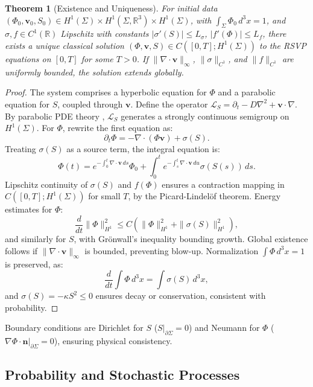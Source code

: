 \documentclass[12pt]{article}
\newtheorem{theorem}{Theorem}
\begin{document}
\begin{theorem}[Existence and Uniqueness]
\label{thm:well-posedness}
For initial data \((\Phi_0, \mathbf{v}_0, S_0) \in H^1(\Sigma) \times H^1(\Sigma, \mathbb{R}^3) \times H^1(\Sigma)\), with \(\int_\Sigma \Phi_0 \, d^3x = 1\), and \(\sigma, f \in C^1(\mathbb{R})\) Lipschitz with constants \(|\sigma'(S)| \leq L_\sigma\), \(|f'(\Phi)| \leq L_f\), there exists a unique classical solution \((\Phi, \mathbf{v}, S) \in C([0, T]; H^1(\Sigma))\) to the RSVP equations on \([0, T]\) for some \(T > 0\). If \(\|\nabla \cdot \mathbf{v}\|_\infty\), \(\|\sigma\|_{C^1}\), and \(\|f\|_{C^1}\) are uniformly bounded, the solution extends globally.
\end{theorem}

\begin{proof}
The system comprises a hyperbolic equation for \(\Phi\) and a parabolic equation for \(S\), coupled through \(\mathbf{v}\). Define the operator \(\mathcal{L}_S = \partial_t - D \nabla^2 + \mathbf{v} \cdot \nabla\). By parabolic PDE theory \citep{Risken1996}, \(\mathcal{L}_S\) generates a strongly continuous semigroup on \(H^1(\Sigma)\). For \(\Phi\), rewrite the first equation as:
\[
\partial_t \Phi = -\nabla \cdot (\Phi \mathbf{v}) + \sigma(S).
\]
Treating \(\sigma(S)\) as a source term, the integral equation is:
\[
\Phi(t) = e^{-\int_0^t \nabla \cdot \mathbf{v} \, ds} \Phi_0 + \int_0^t e^{-\int_s^t \nabla \cdot \mathbf{v} \, du} \sigma(S(s)) \, ds.
\]
Lipschitz continuity of \(\sigma(S)\) and \(f(\Phi)\) ensures a contraction mapping in \(C([0, T]; H^1(\Sigma))\) for small \(T\), by the Picard-Lindelöf theorem. Energy estimates for \(\Phi\):
\[
\frac{d}{dt} \|\Phi\|_{H^1}^2 \leq C (\|\Phi\|_{H^1}^2 + \|\sigma(S)\|_{H^1}^2),
\]
and similarly for \(S\), with Grönwall’s inequality bounding growth. Global existence follows if \(\|\nabla \cdot \mathbf{v}\|_\infty\) is bounded, preventing blow-up. Normalization \(\int \Phi \, d^3x = 1\) is preserved, as:
\[
\frac{d}{dt} \int \Phi \, d^3x = \int \sigma(S) \, d^3x,
\]
and \(\sigma(S) = -\kappa S^2 \leq 0\) ensures decay or conservation, consistent with probability.
\end{proof}

Boundary conditions are Dirichlet for \(S\) (\(S|_{\partial \Sigma} = 0\)) and Neumann for \(\Phi\) (\(\nabla \Phi \cdot \mathbf{n}|_{\partial \Sigma} = 0\)), ensuring physical consistency.

\subsection{Probability and Stochastic Processes}
\end{document}
